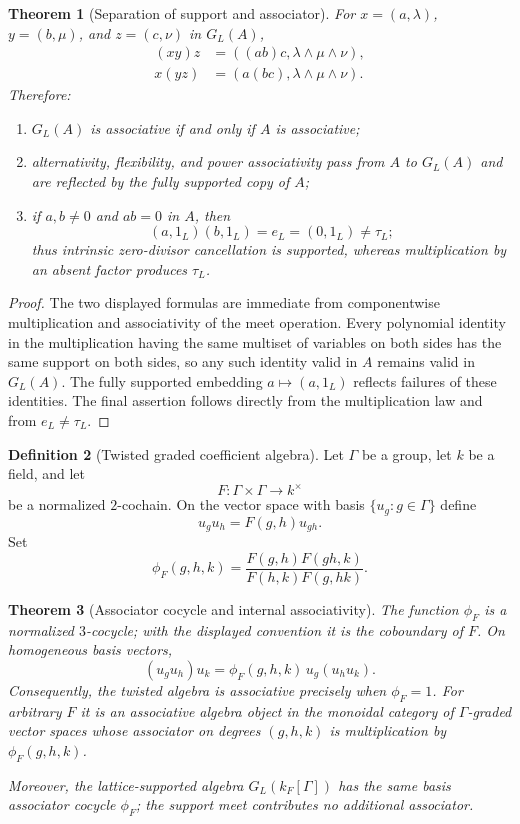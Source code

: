 \documentclass[11pt]{amsart}
\numberwithin{equation}{section}
\newtheorem{theorem}{Theorem}[section]
\theoremstyle{definition}
\newtheorem{definition}[theorem]{Definition}
\begin{document}
\begin{theorem}[Separation of support and associator]
\label{thm:support-associator-separation}
For $x=(a,\lambda)$, $y=(b,\mu)$, and $z=(c,\nu)$ in $G_L(A)$,
\begin{align*}
(xy)z&=((ab)c,\lambda\wedge\mu\wedge\nu),\\
x(yz)&=(a(bc),\lambda\wedge\mu\wedge\nu).
\end{align*}
Therefore:
\begin{enumerate}[label=\textup{(\arabic*)}]
\item $G_L(A)$ is associative if and only if $A$ is associative;
\item alternativity, flexibility, and power associativity pass from $A$
to $G_L(A)$ and are reflected by the fully supported copy of $A$;
\item if $a,b\neq0$ and $ab=0$ in $A$, then
\[
(a,1_L)(b,1_L)=e_L=(0,1_L)\neq\tau_L;
\]
thus intrinsic zero-divisor cancellation is supported, whereas multiplication
by an absent factor produces $\tau_L$.
\end{enumerate}
\end{theorem}

\begin{proof}
The two displayed formulas are immediate from componentwise multiplication
and associativity of the meet operation.  Every polynomial identity in the
multiplication having the same multiset of variables on both sides has the
same support on both sides, so any such identity valid in $A$ remains valid
in $G_L(A)$.  The fully supported embedding $a\mapsto(a,1_L)$ reflects
failures of these identities.  The final assertion follows directly from
the multiplication law and from $e_L\neq\tau_L$.
\end{proof}

\begin{definition}[Twisted graded coefficient algebra]
Let $\Gamma$ be a group, let $k$ be a field, and let
\[
F:\Gamma\times\Gamma\longrightarrow k^\times
\]
be a normalized $2$-cochain.  On the vector space with basis
$\{u_g:g\in\Gamma\}$ define
\[
u_gu_h=F(g,h)u_{gh}.
\]
Set
\[
\phi_F(g,h,k)
=
\frac{F(g,h)F(gh,k)}{F(h,k)F(g,hk)}.
\]
\end{definition}

\begin{theorem}[Associator cocycle and internal associativity]
\label{thm:associator-cocycle}
The function $\phi_F$ is a normalized $3$-cocycle; with the displayed
convention it is the coboundary of $F$.  On homogeneous basis vectors,
\[
(u_gu_h)u_k
=\phi_F(g,h,k)\,u_g(u_hu_k).
\]
Consequently, the twisted algebra is associative precisely when
$\phi_F=1$.  For arbitrary $F$ it is an associative algebra object in the
monoidal category of $\Gamma$-graded vector spaces whose associator on
degrees $(g,h,k)$ is multiplication by $\phi_F(g,h,k)$.

Moreover, the lattice-supported algebra $G_L(k_F[\Gamma])$ has the same
basis associator cocycle $\phi_F$; the support meet contributes no
additional associator.
\end{theorem}
\end{document}

